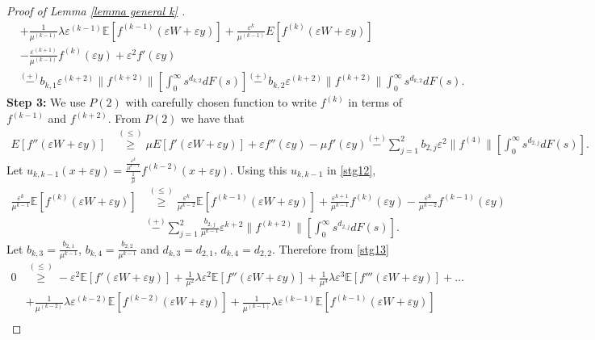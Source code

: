 \documentclass[11pt,letterpaper,reqno]{article}
\theoremstyle{thmstyleone}%
\theoremstyle{thmstyletwo}%
\theoremstyle{thmstylethree}%
\numberwithin{equation}{section}
\begin{document}
\begin{proof}[Proof of Lemma \ref{lemma general k} ]
\begin{align}
        \nonumber &+\frac{1}{\mu^{(k-1)}}\lambda \varepsilon^{(k-1)}\mathbb E[f^{(k-1)}(\varepsilon W+\varepsilon y)]+\frac{\varepsilon^k}{\mu^{(k-1)}}E[f^{(k)}(\varepsilon W+\varepsilon y)]\\
   \nonumber     &-\frac{\varepsilon^{(k+1)}}{\mu^{(k-1)}}f^{(k)}(\varepsilon y)+\varepsilon^2 f'(\varepsilon y)\\
       &\stackrel{(+)}{-}b_{k,1} \varepsilon^{(k+2)} \|f^{(k+2)}\| \left[\int_0^\infty s^{d_{k,2}} dF(s)\right]\stackrel{(+)}{-}b_{k,2}\varepsilon^{(k+2)} \|f^{(k+2)}\|\int_0^\infty s^{d_{k,2}} dF(s).
\end{align}
\textbf{Step 3:} We use $P(2)$ with carefully chosen function to write $f^{(k)}$ in terms of $f^{(k-1)}$ and $f^{(k+2)}$. From $P(2)$ we have that 
\begin{align}\label{stg12}
    E[f''(\varepsilon W+\varepsilon y)]& \stackrel{(\leq)} {\geq} \mu E[f'(\varepsilon W+\varepsilon y)]+\varepsilon f''(\varepsilon y)-\mu f'(\varepsilon y)\stackrel{(+)}{-}\sum_{j=1}^{2}b_{2,j} \varepsilon^{2}\|f^{(4)}\| \left[ \int_0^\infty s^{d_{2,j}} dF(s)\right]  .
\end{align}
Let $u_{k,k-1}(x+\varepsilon y)=\frac{\frac{\varepsilon^k}{\mu^{k-1}}}{\frac{1}{\mu}}f^{(k-2)}(x+\varepsilon y)$. Using this $u_{k,k-1}$ in \eqref{stg12},
\begin{align*}
    \frac{\varepsilon^k}{\mu^{k-1}}\mathbb E[f^{(k)}(\varepsilon W+\varepsilon y)] &\stackrel{(\leq)}{\geq} \frac{\varepsilon^k}{\mu^{k-2}} \mathbb E[f^{(k-1)}(\varepsilon W+\varepsilon y)]+\frac{\varepsilon^{k+1}}{\mu^{k-1}} f^{(k)}(\varepsilon y)-\frac{\varepsilon^k}{\mu^{k-2}}f^{(k-1)}(\varepsilon y)\\
    &\stackrel{(+)}{-}\sum_{j=1}^{2} \frac{b_{2,j}}{\mu^{k-1}} \varepsilon^{k+2} \|f^{(k+2)}\| \left[ \int_0^\infty s^{d_{2,j}}dF(s)\right]  . 
\end{align*}
Let $b_{k,3}=\frac{b_{2,1}}{\mu^{k-1}}$, $b_{k,4}=\frac{b_{2,2}}{\mu^{k-1}}$ and $d_{k,3}=d_{2,1}$, $d_{k,4}=d_{2,2}$. Therefore from \eqref{stg13}
\begin{align}\label{stg14}
0 &\stackrel{(\leq)}{\geq} -\varepsilon^2\mathbb E[f'(\varepsilon W+\varepsilon y)]+\frac{1}{\mu^2}\lambda \varepsilon^2 \mathbb E[f''(\varepsilon W+\varepsilon y)]+\frac{1}{\mu^3}\lambda \varepsilon^3 \mathbb E[f'''(\varepsilon W+\varepsilon y)]+ \ldots \nonumber\\
 &+\frac{1}{\mu^{(k-2)}}\lambda \varepsilon^{(k-2)}\mathbb E[f^{(k-2)}(\varepsilon W+\varepsilon y)]+\frac{1}{\mu^{(k-1)}}\lambda \varepsilon^{(k-1)}\mathbb E[f^{(k-1)}(\varepsilon W+\varepsilon y)] \nonumber \\

\end{align}
\end{proof}
\end{document}
